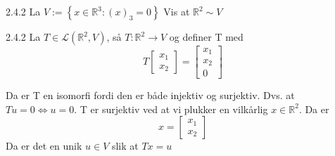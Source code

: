 \documentclass[a4paper,norsk]{article}
\begin{document}
\begin{oppgavebox}{2.4.2}{}
La $ V:= \left\{ x \in  \mathbb{R}^3 : \left( x \right) _3 = 0 \right\}  $ Vis at $ \mathbb{R}^2 \sim V $ 

\begin{proofbox}{2.4.2}{}
La $ T \in \mathcal{L} \left( \mathbb{R}^2, V \right)  $, så $ T: \mathbb{R}^2 \rightarrow V $  og definer T med 
\[
    T \begin{bmatrix}
        x_1\\
        x_2
    \end{bmatrix} = \begin{bmatrix}
        x_1\\
        x_2\\
        0
    \end{bmatrix}
\]

Da er T en isomorfi fordi den er både injektiv og surjektiv. Dvs. at $ Tu = 0 \iff u = 0 $. T er surjektiv ved at vi plukker en vilkårlig $ x \in  \mathbb{R}^2 $. Da er 
\[
    x = \begin{bmatrix}
        x_1\\ x_2
    \end{bmatrix} 
\]
Da er det en unik $ u \in  V $ slik at $ Tx = u $ 
\end{proofbox}
\end{oppgavebox}
\end{document}
